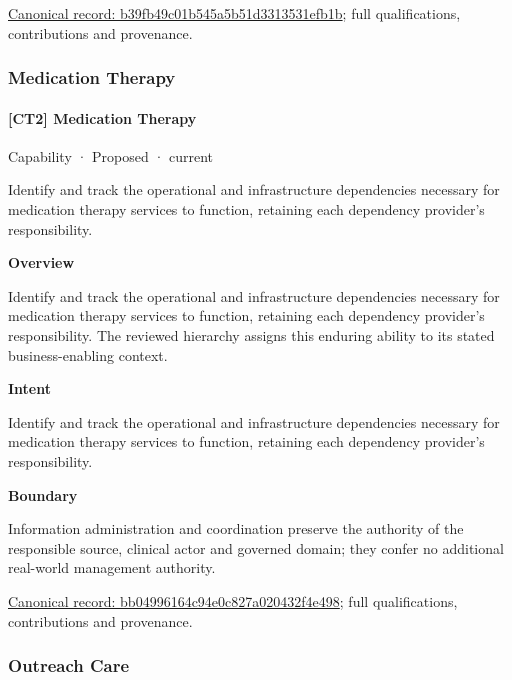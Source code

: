 {\footnotesize \href{../../../../continuum/strategy/capability/b39fb49c01b545a5b51d3313531efb1b.md}{Canonical record: b39fb49c01b545a5b51d3313531efb1b}; full qualifications, contributions and provenance.}\par
\subsubsection{Medication Therapy}

\paragraph{[CT2] Medication Therapy}

\label{element:bb04996164c94e0c827a020432f4e498}
{\small Capability · Proposed · current}\par

Identify and track the operational and infrastructure dependencies necessary for medication therapy services to function, retaining each dependency provider's responsibility.



\textbf{Overview}



Identify and track the operational and infrastructure dependencies necessary for medication therapy services to function, retaining each dependency provider's responsibility. The reviewed hierarchy assigns this enduring ability to its stated business-enabling context.



\textbf{Intent}



Identify and track the operational and infrastructure dependencies necessary for medication therapy services to function, retaining each dependency provider's responsibility.



\textbf{Boundary}



Information administration and coordination preserve the authority of the responsible source, clinical actor and governed domain; they confer no additional real-world management authority.


{\footnotesize \href{../../../../continuum/strategy/capability/bb04996164c94e0c827a020432f4e498.md}{Canonical record: bb04996164c94e0c827a020432f4e498}; full qualifications, contributions and provenance.}\par
\subsubsection{Outreach Care}

